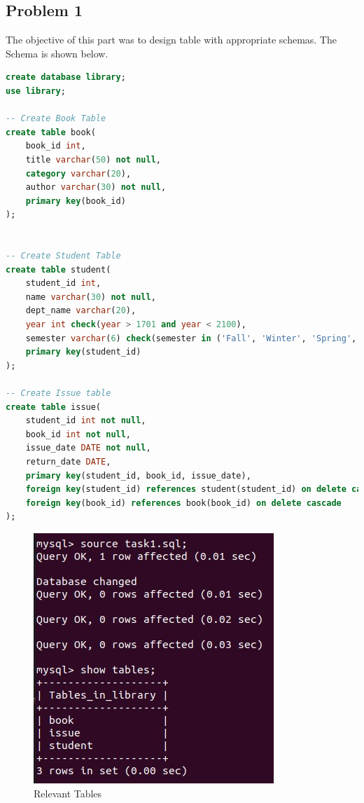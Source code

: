 \documentclass{article}
\begin{document}
\subsection{Problem 1}
The objective of this part was to design table with appropriate schemas. The Schema is shown below.
\begin{lstlisting}[language=sql]
create database library;
use library;

-- Create Book Table
create table book(
    book_id int,
    title varchar(50) not null,
    category varchar(20),
    author varchar(30) not null,
    primary key(book_id)
);


-- Create Student Table
create table student(
    student_id int,
    name varchar(30) not null,
    dept_name varchar(20),
    year int check(year > 1701 and year < 2100),
    semester varchar(6) check(semester in ('Fall', 'Winter', 'Spring', 'Summer')),
    primary key(student_id)
);

-- Create Issue table
create table issue(
    student_id int not null, 
    book_id int not null, 
    issue_date DATE not null, 
    return_date DATE,
    primary key(student_id, book_id, issue_date),
    foreign key(student_id) references student(student_id) on delete cascade,
    foreign key(book_id) references book(book_id) on delete cascade
);
\end{lstlisting}
\begin{figure}[!ht]
  \begin{center}
    \includegraphics[scale=0.6]{1.jpg}
  \caption{Relevant Tables}
  \end{center}
\end{figure}
\end{document}

